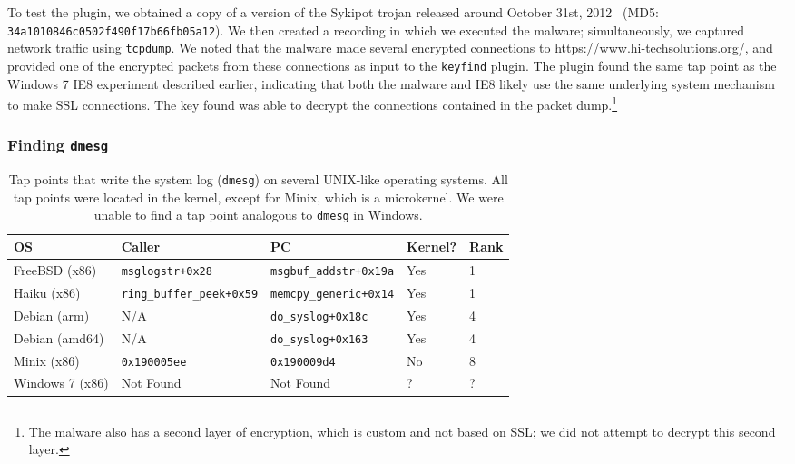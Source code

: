 To test the plugin, we obtained a copy of a version of the Sykipot
trojan released around October 31st, 2012~\cite{sandymal} (MD5:
\texttt{34a1010846c0502f490f17b66fb05a12}). We then created a recording
in which we executed the malware; simultaneously, we captured network
traffic using \texttt{tcpdump}. We noted that the malware made several
encrypted connections to \url{https://www.hi-techsolutions.org/}, and
provided one of the encrypted packets from these connections as input to
the \texttt{keyfind} plugin. The plugin found the same tap point as the
Windows 7 IE8 experiment described earlier, indicating
that both the malware and IE8 likely use the same underlying system
mechanism to make SSL connections. The key found was able to decrypt the
connections contained in the packet dump.\footnote{The malware also has
a second layer of encryption, which is custom and not based on SSL; we
did not attempt to decrypt this second layer.}

\subsubsection{Finding \large \texttt{dmesg}}
\label{sec:eval:subsec:dmesg}

\begin{table*}
    \centering
    \small
    \begin{tabular}{|l|l|l|l|l|}
        \hline
        OS & Caller & PC & Kernel? & Rank \\
        \hline
        FreeBSD (x86) & \texttt{msglogstr+0x28} & \texttt{msgbuf\_addstr+0x19a} & Yes & 1 \\
        Haiku (x86) & \texttt{ring\_buffer\_peek+0x59} & \texttt{memcpy\_generic+0x14} & Yes & 1 \\
        Debian (arm) & N/A & \texttt{do\_syslog+0x18c} & Yes & 4 \\
        Debian (amd64) & N/A & \texttt{do\_syslog+0x163} & Yes & 4 \\ 
        Minix (x86) & \texttt{0x190005ee} & \texttt{0x190009d4} & No & 8 \\
        Windows 7 (x86) & Not Found & Not Found & ? & ? \\
        \hline
    \end{tabular}
\caption{Tap points that write the system log (\texttt{dmesg}) on
several UNIX-like operating systems. All tap points were located in the
kernel, except for Minix, which is a microkernel. We were unable to find
a tap point analogous to \texttt{dmesg} in Windows.}
\label{tbl:dmesg}
\end{table*}

